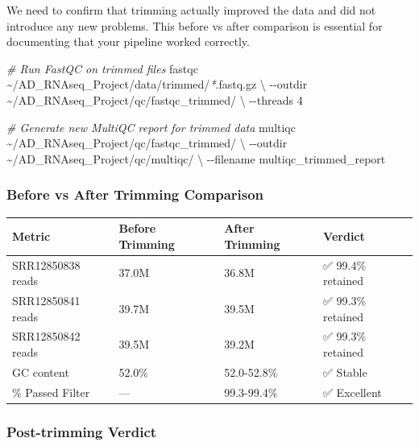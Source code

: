\documentclass[
]{article}
\newenvironment{Shaded}{\begin{snugshade}}{\end{snugshade}}
\newcommand{\AttributeTok}[1]{\textcolor[rgb]{0.13,0.29,0.53}{#1}}
\newcommand{\CommentTok}[1]{\textcolor[rgb]{0.56,0.35,0.01}{\textit{#1}}}
\newcommand{\DataTypeTok}[1]{\textcolor[rgb]{0.13,0.29,0.53}{#1}}
\newcommand{\ExtensionTok}[1]{#1}
\newcommand{\NormalTok}[1]{#1}
\newcommand{\PreprocessorTok}[1]{\textcolor[rgb]{0.56,0.35,0.01}{\textit{#1}}}
\begin{document}
We need to confirm that trimming actually improved the data and did not
introduce any new problems. This before vs after comparison is essential
for documenting that your pipeline worked correctly.

\begin{Shaded}
\begin{Highlighting}[]
\CommentTok{\# Run FastQC on trimmed files}
\ExtensionTok{fastqc}\NormalTok{ \textasciitilde{}/AD\_RNAseq\_Project/data/trimmed/}\PreprocessorTok{*}\NormalTok{.fastq.gz }\DataTypeTok{\textbackslash{}}
    \AttributeTok{{-}{-}outdir}\NormalTok{ \textasciitilde{}/AD\_RNAseq\_Project/qc/fastqc\_trimmed/ }\DataTypeTok{\textbackslash{}}
    \AttributeTok{{-}{-}threads}\NormalTok{ 4}

\CommentTok{\# Generate new MultiQC report for trimmed data}
\ExtensionTok{multiqc}\NormalTok{ \textasciitilde{}/AD\_RNAseq\_Project/qc/fastqc\_trimmed/ }\DataTypeTok{\textbackslash{}}
    \AttributeTok{{-}{-}outdir}\NormalTok{ \textasciitilde{}/AD\_RNAseq\_Project/qc/multiqc/ }\DataTypeTok{\textbackslash{}}
    \AttributeTok{{-}{-}filename}\NormalTok{ multiqc\_trimmed\_report}
\end{Highlighting}
\end{Shaded}

\subsubsection{Before vs After Trimming
Comparison}\label{before-vs-after-trimming-comparison}

\begin{longtable}[]{@{}llll@{}}
\toprule\noalign{}
Metric & Before Trimming & After Trimming & Verdict \\
\midrule\noalign{}
\endhead
\bottomrule\noalign{}
\endlastfoot
SRR12850838 reads & 37.0M & 36.8M & ✅ 99.4\% retained \\
SRR12850841 reads & 39.7M & 39.5M & ✅ 99.3\% retained \\
SRR12850842 reads & 39.5M & 39.2M & ✅ 99.3\% retained \\
GC content & 52.0\% & 52.0-52.8\% & ✅ Stable \\
\% Passed Filter & --- & 99.3-99.4\% & ✅ Excellent \\
\end{longtable}

\subsubsection{Post-trimming Verdict}\label{post-trimming-verdict}
\end{document}
